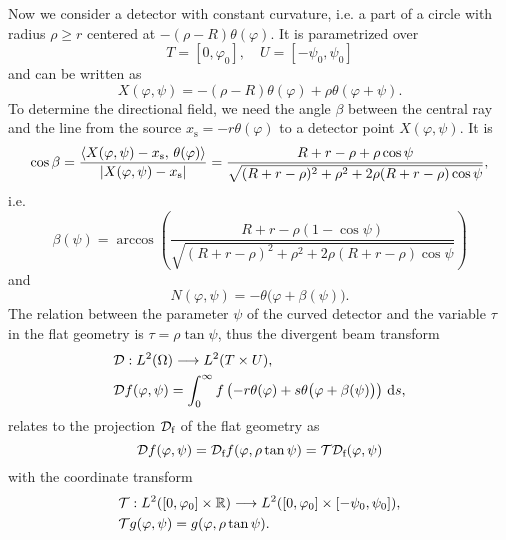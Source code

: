 \documentclass{amsart}
\renewcommand*{\phi}{\varphi}
\begin{document}
Now we consider a detector with constant curvature, i.e. a part of a circle with radius $\rho \geq r$ centered at $-(\rho-R)\theta(\phi)$. 
It is parametrized over
%
\begin{equation*}
 T = [0, \phi_0],\quad U = [-\psi_0, \psi_0]
\end{equation*}
%
and can be written as
%
\begin{equation}
 \label{eq:fancurved:detector_parametr}
 X(\phi,\psi) = -(\rho-R) \theta(\phi) + \rho \theta(\phi + \psi).
\end{equation} 
%
To determine the directional field, we need the angle $\beta$ between the central ray and the line from the source $x_{\text{s}} = 
-r\theta(\phi)$ to a detector point $X(\phi,\psi)$. It is
%
\begin{equation*}
 \cos\beta = \frac{\INNER{X(\phi,\psi)-x_{\text{s}}}{\theta(\phi)}}{\ABSLR{X(\phi,\psi)-x_{\text{s}}}}
 = \frac{R+r-\rho + \rho\cos\psi}{\sqrt{(R+r-\rho)^2 + \rho^2 + 2\rho(R+r-\rho)\cos\psi}},
\end{equation*}
%
i.e.
%
\begin{equation}
 \label{eq:fancurved:direction_field_angle}
 \beta(\psi) = \arccos \left( \frac{R+r-\rho(1-\cos\psi)}{\sqrt{(R+r-\rho)^2 + \rho^2 + 2\rho(R+r-\rho)\cos\psi}} \right)
\end{equation} 
%
and
\begin{equation}
 \label{eq:fancurved:direction_field}
 N(\phi,\psi) = -\theta\big(\phi + \beta(\psi)\big).
\end{equation} 
%
The relation between the parameter $\psi$ of the curved detector and the variable $\tau$ in the flat geometry is $\tau = \rho\tan\psi$, 
thus the divergent beam transform
%
\begin{align}
 &\OPD: L^2(\Omega) \Lto L^2(T \times U), \notag \\
 \label{eq:fancurved:fwdproj}
 &\OPD f(\phi, \psi) = \int_0^\infty f\left(-r \theta(\phi) + s \theta\big(\phi + \beta(\psi)\big) \right)\, \D s,
\end{align}
%
relates to the projection ${\mathcal{D}}_{\text{f}}$ of the flat geometry as
%
\begin{equation*}
 \OPD f(\phi,\psi) = \OPD_{\text{f}} f(\phi, \rho\tan\psi) = \OPT \OPD_{\text{f}}(\phi,\psi)
\end{equation*} 
%
with the coordinate transform
%
\begin{align}
 & \OPT: L^2([0,\phi_0]\times \RR) \Lto L^2([0,\phi_0] \times [-\psi_0, \psi_0]), \notag \\
 \label{eq:fancurved:coord_op}
 & \OPT g(\phi, \psi) = g(\phi, \rho\tan\psi).
\end{align}
\end{document}
